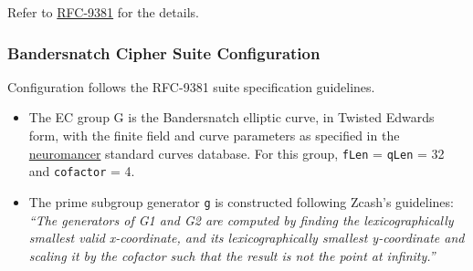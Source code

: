 \documentclass[
]{article}
\begin{document}
Refer to \href{https://www.rfc-editor.org/rfc/rfc9381}{RFC-9381} for the
details.

\hypertarget{bandersnatch-cipher-suite-configuration}{%
\subsubsection{Bandersnatch Cipher Suite
Configuration}\label{bandersnatch-cipher-suite-configuration}}

Configuration follows the RFC-9381 suite specification guidelines.

\begin{itemize}
\item
  The EC group G is the Bandersnatch elliptic curve, in Twisted Edwards
  form, with the finite field and curve parameters as specified in the
  \href{https://neuromancer.sk/std/bls/Bandersnatch}{neuromancer}
  standard curves database. For this group, \texttt{fLen} =
  \texttt{qLen} = 32 and \texttt{cofactor} = 4.
\item
  The prime subgroup generator \texttt{g} is constructed following
  Zcash's guidelines: \emph{``The generators of G1 and G2 are computed
  by finding the lexicographically smallest valid x-coordinate, and its
  lexicographically smallest y-coordinate and scaling it by the cofactor
  such that the result is not the point at infinity.''}


\end{itemize}
\end{document}
